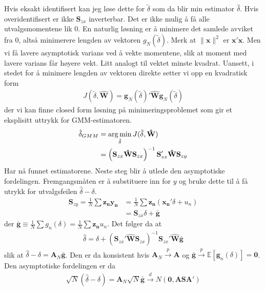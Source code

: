 Hvis eksakt identifisert kan jeg løse dette for $\tilde{\delta}$ som da blir min estimator $\hat{\delta}$. Hvis overidentifisert er ikke $\mathbf{S}_{zx}$ inverterbar. Det er ikke mulig å få alle utvalgsmomentene lik $0$. En naturlig løsning er å minimere det samlede avviket fra $0$, altså minimerere lengden av vektoren $g_N(\tilde{\delta})$. Merk at $\| \mathbf{x} \|^2$ er $\mathbf{x}'\mathbf{x}$. Men vi få lavere asymptotisk varians ved å vekte momentene, slik at moment med lavere varians får høyere vekt. Litt analogt til vektet minste kvadrat. Uansett, i stedet for å minimere lengden av vektoren direkte setter vi opp en kvadratisk form
\begin{align}
J(\tilde{\delta},\mathbf{\hat{W}}) = \mathbf{g}_N(\tilde{\delta})'\mathbf{\hat{W}}\mathbf{g}_N(\tilde{\delta}) 
\end{align}
der vi kan finne closed form løsning på minimeringsproblemet som gir et eksplisitt uttrykk for GMM-estimatoren.
\begin{align}
\hat{\delta}_{GMM} &= \operatorname*{arg\,min}_{\tilde{\delta}} J(\tilde{\delta},\mathbf{\hat{W}}) \\
&= \left( \mathbf{S}_{zx}\mathbf{\hat{W}}\mathbf{S}_{zx}\right)^{-1}\mathbf{S}_{zx}'\mathbf{\hat{W}} \mathbf{S}_{zy}
\end{align}
Har nå funnet estimatorene. Neste steg blir å utlede den asymptotiske fordelingen. Fremgangsmåten er å substituere inn for $y$ og bruke dette til å få utrykk for utvalgsfeilen $\hat{\delta} - \delta$.
\begin{align}
\mathbf{S}_{zy} = \frac{1}{N}\sum \mathbf{z_n}\mathbf{y_n} &= \frac{1}{N}\sum \mathbf{z_n}(\mathbf{x_n}'\delta+u_n) \\
&= \mathbf{S}_{zx}\delta + \bar{\mathbf{g}}
\end{align}
der $\bar{\mathbf{g}} \equiv \frac{1}{N}\sum g_n(\delta) = \frac{1}{N}\sum \mathbf{z_n}u_n$. Det følger da at
\begin{align}
\hat{\delta} = \delta + \left(\mathbf{S}_{zx}' \mathbf{\hat{W}} \mathbf{S}_{zx}\right)^{-1}\mathbf{S}_{zx}'\mathbf{\hat{W}}\bar{\mathbf{g}}
\end{align}
slik at $\hat{\delta} - \delta = \mathbf{A}_N\bar{\mathbf{g}}$. Den er da konsistent hvis $\mathbf{A}_N \overset{p}{\rightarrow} \mathbf{A}$ og $\bar{\mathbf{g}}\overset{p}{\rightarrow} \mathbb{E}[\mathbf{g}_n(\delta)] = \mathbf{0}$. Den asymptotiske fordelingen er da
\begin{align}
\sqrt{N}(\hat{\delta} - \delta) = \mathbf{A}_N\sqrt{N}\bar{\mathbf{g}} \overset{d}{\rightarrow} N(\mathbf{0},\mathbf{A}\mathbf{S}\mathbf{A}')
\end{align}
